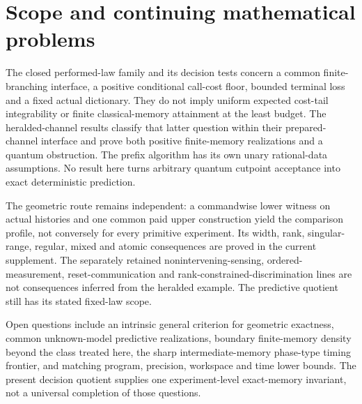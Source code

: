 \section{Scope and continuing mathematical problems}\label{sec:r65-scope}
The closed performed-law family and its decision tests concern a common finite-branching interface, a positive conditional call-cost floor, bounded terminal loss and a fixed actual dictionary. They do not imply uniform expected cost-tail integrability or finite classical-memory attainment at the least budget. The heralded-channel results classify that latter question within their prepared-channel interface and prove both positive finite-memory realizations and a quantum obstruction. The prefix algorithm has its own unary rational-data assumptions. No result here turns arbitrary quantum cutpoint acceptance into exact deterministic prediction.

The geometric route remains independent: a commandwise lower witness on actual histories and one common paid upper construction yield the comparison profile, not conversely for every primitive experiment. Its width, rank, singular-range, regular, mixed and atomic consequences are proved in the current supplement. The separately retained nonintervening-sensing, ordered-measurement, reset-communication and rank-constrained-discrimination lines are not consequences inferred from the heralded example. The predictive quotient still has its stated fixed-law scope.

Open questions include an intrinsic general criterion for geometric exactness, common unknown-model predictive realizations, boundary finite-memory density beyond the class treated here, the sharp intermediate-memory phase-type timing frontier, and matching program, precision, workspace and time lower bounds. The present decision quotient supplies one experiment-level exact-memory invariant, not a universal completion of those questions.


